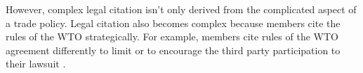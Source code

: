 However, complex legal citation isn't only derived from the complicated aspect of a trade policy.
Legal citation also becomes complex because members cite the rules of the WTO strategically. For example,
members cite rules of the WTO agreement differently to limit or to encourage 
the third party participation to their lawsuit \cite{who_gets}.
